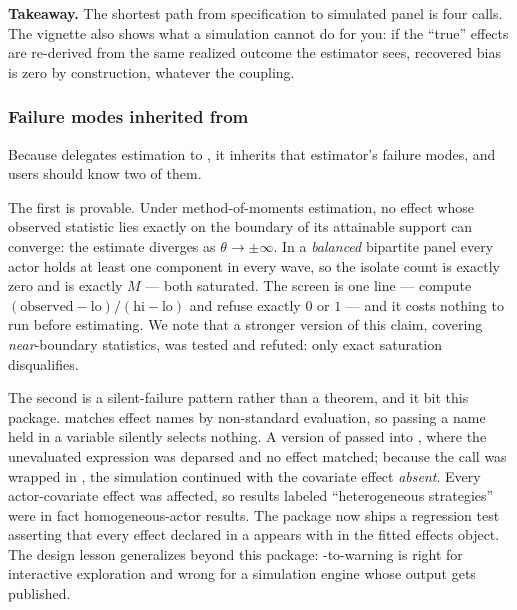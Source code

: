 \documentclass[
  article]{jss}
\begin{document}
\textbf{Takeaway.} The shortest path from specification to simulated
panel is four calls. The vignette also shows what a simulation cannot do
for you: if the ``true'' effects are re-derived from the same realized
outcome the estimator sees, recovered bias is zero by construction,
whatever the coupling.

\subsubsection[Failure modes inherited from RSiena]{Failure modes inherited from }\label{sec:app-failures}

Because  delegates estimation to , it
inherits that estimator's failure modes, and users should know two of
them.

The first is provable. Under method-of-moments estimation, no effect
whose observed statistic lies exactly on the boundary of its attainable
support can converge: the estimate diverges as \(\theta \to \pm\infty\).
In a \emph{balanced} bipartite panel every actor holds at least one
component in every wave, so the isolate count is exactly zero and
 is exactly \(M\) --- both saturated. The screen is
one line --- compute
\((\text{observed} - \text{lo}) / (\text{hi} - \text{lo})\) and refuse
exactly \(0\) or \(1\) --- and it costs nothing to run before
estimating. We note that a stronger version of this claim, covering
\emph{near}-boundary statistics, was tested and refuted: only exact
saturation disqualifies.

The second is a silent-failure pattern rather than a theorem, and it bit
this package.  matches effect names by
non-standard evaluation, so passing a name held in a variable silently
selects nothing. A version of  passed
 into , where the unevaluated
expression was deparsed and no effect matched; because the call was
wrapped in , the
simulation continued with the covariate effect \emph{absent}. Every
actor-covariate effect was affected, so results labeled ``heterogeneous
strategies'' were in fact homogeneous-actor results. The package now
ships a regression test asserting that every effect declared in a
 appears with  in the
fitted effects object. The design lesson generalizes beyond this
package: -to-warning is right for interactive exploration
and wrong for a simulation engine whose output gets published.
\end{document}
